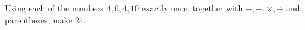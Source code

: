 Using each of the numbers $4,6,4,10$ exactly once, together with $+,-,\times,\div$ and parentheses, make $24$.
